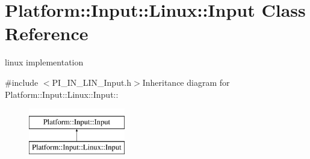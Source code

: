\hypertarget{classPlatform_1_1Input_1_1Linux_1_1Input}{
\section{Platform::Input::Linux::Input Class Reference}
\label{classPlatform_1_1Input_1_1Linux_1_1Input}
}


linux implementation  


{\ttfamily \#include $<$PI\_\-IN\_\-LIN\_\-Input.h$>$}Inheritance diagram for Platform::Input::Linux::Input::\begin{figure}[H]
\begin{center}
\leavevmode
\includegraphics[height=2cm]{classPlatform_1_1Input_1_1Linux_1_1Input}
\end{center}
\end{figure}
